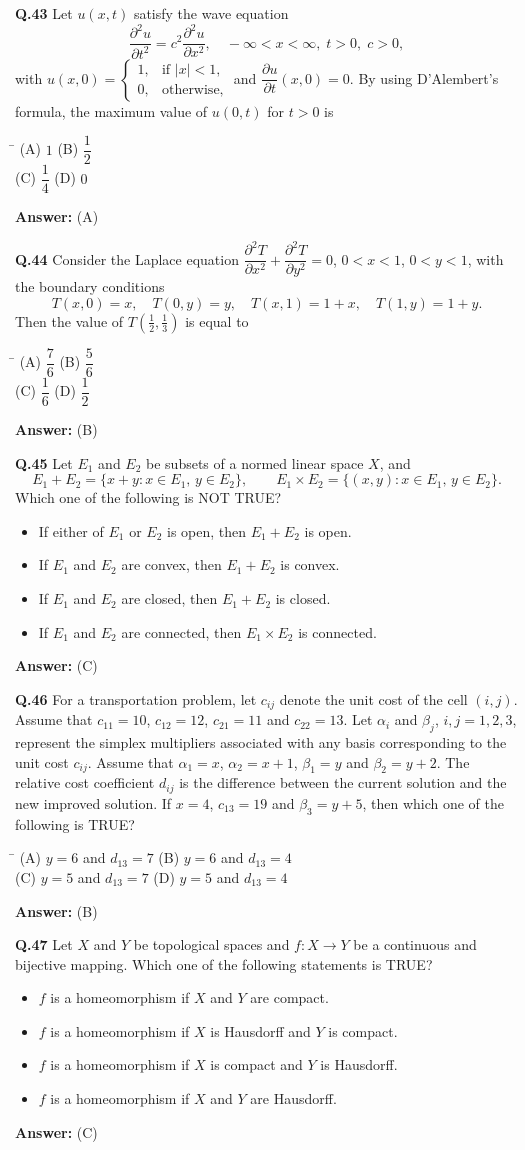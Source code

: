 \documentclass[11pt,a4paper]{article}
\newcommand{\optsfourA}[4]{%
  \begin{tabbing}
    \hspace{0.48\linewidth}\=\kill
    (A) #1 \> (B) #2 \\[2pt]
    (C) #3 \> (D) #4
  \end{tabbing}%
}
\newcommand{\optslistA}[4]{%
  \begin{itemize}
    \setlength{\itemsep}{2pt}\setlength{\parskip}{0pt}
    \item[(A)] #1
    \item[(B)] #2
    \item[(C)] #3
    \item[(D)] #4
  \end{itemize}%
}
\newcommand{\ans}[1]{\textbf{Answer:} #1\par\medskip}
\begin{document}
\textbf{Q.43} Let $u(x, t)$ satisfy the wave equation
\[
  \frac{\partial^2 u}{\partial t^2} = c^2 \frac{\partial^2 u}{\partial x^2}, \quad -\infty < x < \infty, \; t > 0, \; c > 0,
\]
with $u(x, 0) = \begin{cases} 1, & \text{if } |x| < 1, \\ 0, & \text{otherwise,} \end{cases}$ and $\dfrac{\partial u}{\partial t}(x, 0) = 0$. By using D'Alembert's formula, the maximum value of $u(0, t)$ for $t > 0$ is
\optsfourA{$1$}{$\dfrac{1}{2}$}{$\dfrac{1}{4}$}{$0$}
\ans{(A)}

\textbf{Q.44} Consider the Laplace equation $\dfrac{\partial^2 T}{\partial x^2} + \dfrac{\partial^2 T}{\partial y^2} = 0$, $0 < x < 1$, $0 < y < 1$, with the boundary conditions
\[
  T(x, 0) = x, \quad T(0, y) = y, \quad T(x, 1) = 1 + x, \quad T(1, y) = 1 + y.
\]
Then the value of $T\!\left(\frac{1}{2}, \frac{1}{3}\right)$ is equal to
\optsfourA{$\dfrac{7}{6}$}{$\dfrac{5}{6}$}{$\dfrac{1}{6}$}{$\dfrac{1}{2}$}
\ans{(B)}

\textbf{Q.45} Let $E_1$ and $E_2$ be subsets of a normed linear space $X$, and
\[
  E_1 + E_2 = \{x + y : x \in E_1, \, y \in E_2\}, \qquad E_1 \times E_2 = \{(x, y) : x \in E_1, \, y \in E_2\}.
\]
Which one of the following is NOT TRUE?
\optslistA{If either of $E_1$ or $E_2$ is open, then $E_1 + E_2$ is open.}{If $E_1$ and $E_2$ are convex, then $E_1 + E_2$ is convex.}{If $E_1$ and $E_2$ are closed, then $E_1 + E_2$ is closed.}{If $E_1$ and $E_2$ are connected, then $E_1 \times E_2$ is connected.}
\ans{(C)}

\textbf{Q.46} For a transportation problem, let $c_{ij}$ denote the unit cost of the cell $(i, j)$. Assume that $c_{11} = 10$, $c_{12} = 12$, $c_{21} = 11$ and $c_{22} = 13$. Let $\alpha_i$ and $\beta_j$, $i, j = 1, 2, 3$, represent the simplex multipliers associated with any basis corresponding to the unit cost $c_{ij}$. Assume that $\alpha_1 = x$, $\alpha_2 = x + 1$, $\beta_1 = y$ and $\beta_2 = y + 2$. The relative cost coefficient $d_{ij}$ is the difference between the current solution and the new improved solution. If $x = 4$, $c_{13} = 19$ and $\beta_3 = y + 5$, then which one of the following is TRUE?
\optsfourA{$y = 6$ and $d_{13} = 7$}{$y = 6$ and $d_{13} = 4$}{$y = 5$ and $d_{13} = 7$}{$y = 5$ and $d_{13} = 4$}
\ans{(B)}

\textbf{Q.47} Let $X$ and $Y$ be topological spaces and $f : X \to Y$ be a continuous and bijective mapping. Which one of the following statements is TRUE?
\optslistA{$f$ is a homeomorphism if $X$ and $Y$ are compact.}{$f$ is a homeomorphism if $X$ is Hausdorff and $Y$ is compact.}{$f$ is a homeomorphism if $X$ is compact and $Y$ is Hausdorff.}{$f$ is a homeomorphism if $X$ and $Y$ are Hausdorff.}
\ans{(C)}
\end{document}
